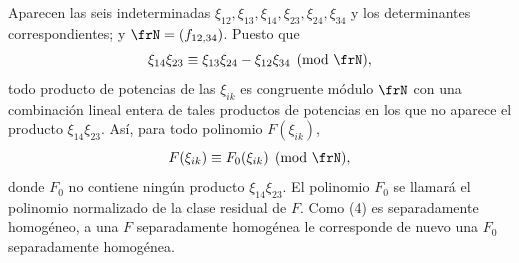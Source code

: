 \documentclass[11pt]{article}
\begin{document}
Aparecen las seis indeterminadas \(\xi_{12},\xi_{13},\xi_{14},\xi_{23},\xi_{24},\xi_{34}\) y los determinantes correspondientes; y \(\frN=(f_{12,34})\). Puesto que
\begin{equation}
        \xi_{14}\xi_{23}\equiv \xi_{13}\xi_{24}-\xi_{12}\xi_{34}\pmod{\frN},
\end{equation}
todo producto de potencias de las \(\xi_{ik}\) es congruente módulo \(\frN\) con una combinación lineal entera de tales productos de potencias en los que no aparece el producto \(\xi_{14}\xi_{23}\). Así, para todo polinomio \(F(\xi_{ik})\),
\begin{equation}
        F(\xi_{ik})\equiv F_0(\xi_{ik})\pmod{\frN},
\end{equation}
donde \(F_0\) no contiene ningún producto \(\xi_{14}\xi_{23}\). El polinomio \(F_0\) se llamará el polinomio normalizado de la clase residual de \(F\). Como (4) es separadamente homogéneo, a una \(F\) separadamente homogénea le corresponde de nuevo una \(F_0\) separadamente homogénea.
\end{document}

